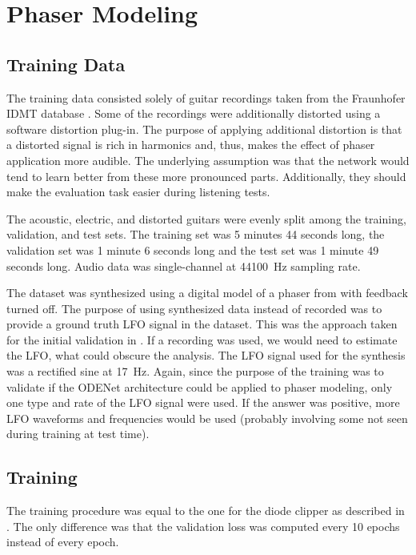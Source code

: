 \section{Phaser Modeling}

\subsection{Training Data}
\label{sec:phaser_training_data}

The training data consisted solely of guitar recordings taken from the Fraunhofer IDMT database \cite{Kehling2014}. Some of the recordings were additionally distorted using a software distortion plug-in. The purpose of applying additional distortion is that a distorted signal is rich in harmonics and, thus, makes the effect of phaser application more audible. The underlying assumption was that the network would tend to learn better from these more pronounced parts. Additionally, they should make the evaluation task easier during listening tests. 

The acoustic, electric, and distorted guitars were evenly split among the training, validation, and test sets. The training set was 5 minutes 44 seconds long, the validation set was 1 minute 6 seconds long and the test set was 1 minute 49 seconds long. Audio data was single-channel at \SI{44100}{Hz} sampling rate.

The dataset was synthesized using a digital model of a phaser from \cite{Kiiski2016} with feedback turned off. The purpose of using synthesized data instead of recorded was to provide a ground truth LFO signal in the dataset. This was the approach taken for the initial validation in \cite{Wright2020}. If a recording was used, we would need to estimate the LFO, what could obscure the analysis. The LFO signal used for the synthesis was a rectified sine at \SI{17}{Hz}. Again, since the purpose of the training was to validate if the ODENet architecture could be applied to phaser modeling, only one type and rate of the LFO signal were used. If the answer was positive, more LFO waveforms and frequencies would be used (probably involving some not seen during training at test time). 

\subsection{Training}
\label{sec:phaser_training}
The training procedure was equal to the one for the diode clipper as described in . The only difference was that the validation loss was computed every 10 epochs instead of every epoch.

